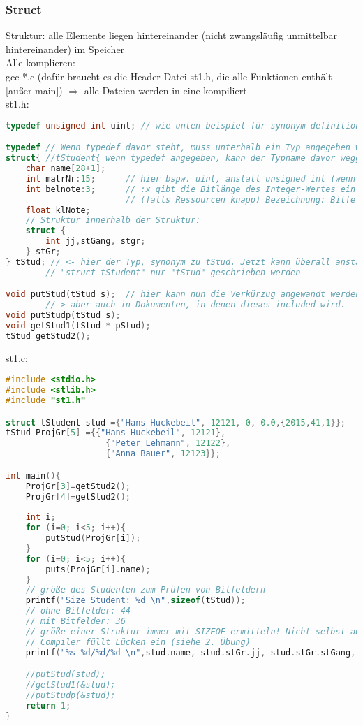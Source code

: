 \subsubsection{Struct}
Struktur: alle Elemente liegen hintereinander (nicht zwangsläufig unmittelbar hintereinander) im Speicher \medskip\\
Alle komplieren:\\
gcc *.c (dafür braucht es die Header Datei st1.h, die alle Funktionen enthält [außer main]) $\Rightarrow$ alle Dateien werden in eine kompiliert\\
st1.h:
\begin{lstlisting}[language=C]
typedef unsigned int uint; // wie unten beispiel für synonym definition

typedef	// Wenn typedef davor steht, muss unterhalb ein Typ angegeben werden
struct{ //tStudent{ wenn typedef angegeben, kann der Typname davor weggelassen werden.
	char name[28+1];
	int matrNr:15;		// hier bspw. uint, anstatt unsigned int (wenn benötigt)
	int belnote:3;		// :x gibt die Bitlänge des Integer-Wertes ein 
						// (falls Ressourcen knapp) Bezeichnung: Bitfelder
	float klNote;
	// Struktur innerhalb der Struktur:
	struct {
		int jj,stGang, stgr;
	} stGr;
} tStud; // <- hier der Typ, synonym zu tStud. Jetzt kann überall anstatt 
		// "struct tStudent" nur "tStud" geschrieben werden

void putStud(tStud s);	// hier kann nun die Verkürzug angewandt werden 
		//-> aber auch in Dokumenten, in denen dieses included wird.
void putStudp(tStud s);
void getStud1(tStud * pStud);
tStud getStud2();
\end{lstlisting}
st1.c:
\begin{lstlisting}[language=C]
#include <stdio.h>
#include <stlib.h>
#include "st1.h"

struct tStudent stud ={"Hans Huckebeil", 12121, 0, 0.0,{2015,41,1}};
tStud ProjGr[5] ={{"Hans Huckebeil", 12121},
					{"Peter Lehmann", 12122},
					{"Anna Bauer", 12123}};

int main(){
	ProjGr[3]=getStud2();
	ProjGr[4]=getStud2();
	
	int i;
	for (i=0; i<5; i++){
		putStud(ProjGr[i]);
	}
	for (i=0; i<5; i++){
		puts(ProjGr[i].name);
	}
	// größe des Studenten zum Prüfen von Bitfeldern
	printf("Size Student: %d \n",sizeof(tStud));
	// ohne Bitfelder: 44
	// mit Bitfelder: 36
	// größe einer Struktur immer mit SIZEOF ermitteln! Nicht selbst ausrechnen
	// Compiler füllt Lücken ein (siehe 2. Übung)
	printf("%s %d/%d/%d \n",stud.name, stud.stGr.jj, stud.stGr.stGang, stud.stGr.stgr);

	//putStud(stud);
	//getStud1(&stud);
	//putStudp(&stud);
	return 1;
}
\end{lstlisting}

